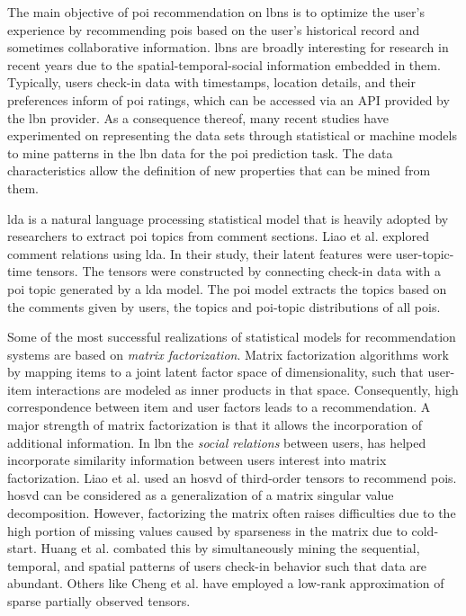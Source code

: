 The main objective of \gls{poi} recommendation on \glspl{lbn} is to optimize the user's experience by recommending \glspl{poi} based on the user's historical record and sometimes collaborative information. \Glspl{lbn} are broadly interesting for research in recent years due to the spatial-temporal-social information embedded in them\parencite{Cheng2011ExploringServices}. Typically, users check-in data with timestamps, location details, and their preferences inform of \gls{poi} ratings, which can be accessed via an API provided by the \gls{lbn} provider. As a consequence thereof, many recent studies have experimented on representing the data sets through statistical or machine models to mine patterns in the \gls{lbn} data for the \gls{poi} prediction task. The data characteristics allow the definition of new properties that can be mined from them.

\Gls{lda} is a natural language processing statistical model that is heavily adopted by researchers to extract \gls{poi} topics from comment sections\parencite{Liao2018POIFactorization, Huang2020Multi-modalNetworks}. Liao et al.\parencite{Liao2018POIFactorization} explored comment relations using \gls{lda}. In their study, their latent features were user-topic-time \glspl{tensor}. The \glspl{tensor} were constructed by connecting check-in data with a \gls{poi} topic generated by a \gls{lda} model. The \gls{poi} model extracts the topics based on the comments given by users, the topics and \gls{poi}-topic distributions of all \glspl{poi}. 

Some of the most successful realizations of statistical models for recommendation systems are based on \textit{matrix factorization}\parencite{Cheng2013WhereRecommendation,ChengFusedNetworks, Chen2018PrivacyFactorization, GaoExploringNetworks, LianContent-awareData}. Matrix factorization\parencite{Koren2009MatrixSystems} algorithms work by mapping items to a joint latent factor space of dimensionality, such that user-item interactions are modeled as inner products in that space. Consequently, high correspondence between item and user factors leads to a recommendation. A major strength of matrix factorization is that it allows the incorporation of additional information. In \gls{lbn} the \textit{social relations} between users, has helped incorporate similarity information between users interest into matrix factorization\parencite{Cheng2013WhereRecommendation, Liao2018POIFactorization, Huang2020Multi-modalNetworks}. Liao et al.\parencite{Liao2018POIFactorization} used an \gls{hosvd} of third-order \glspl{tensor} to recommend \glspl{poi}. \Gls{hosvd} can be considered as a generalization of a matrix singular value decomposition\parencite{Vandewalle1990SingularProcessing}. However, factorizing the matrix often raises difficulties due to the high portion of missing values caused by sparseness in the matrix due to cold-start. Huang et al.\parencite{Huang2020Multi-modalNetworks} combated this by simultaneously mining the sequential, temporal, and spatial patterns of users check-in behavior such that data are abundant. Others like Cheng et al.\parencite{Cheng2013WhereRecommendation} have employed a low-rank approximation of sparse partially observed \glspl{tensor}.

